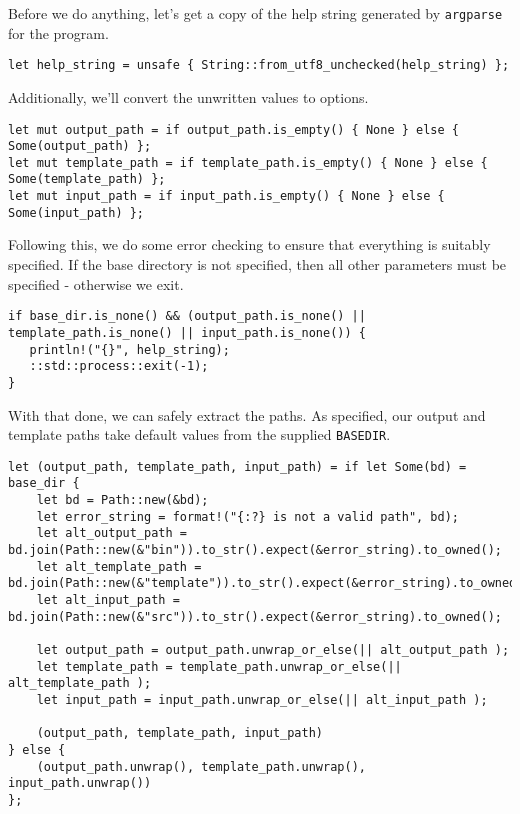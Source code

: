 \documentclass[11pt]{article}
\begin{document}
Before we do anything, let's get a copy of the help string generated by \texttt{argparse} for the program.
\begin{verbatim}
let help_string = unsafe { String::from_utf8_unchecked(help_string) };
\end{verbatim}

Additionally, we'll convert the unwritten values to options.
\begin{verbatim}
let mut output_path = if output_path.is_empty() { None } else { Some(output_path) };
let mut template_path = if template_path.is_empty() { None } else { Some(template_path) };
let mut input_path = if input_path.is_empty() { None } else { Some(input_path) };
\end{verbatim}

Following this, we  do some error checking to ensure that everything is suitably specified.
If the base directory is not specified, then all other parameters must be specified - otherwise we exit.
\begin{verbatim}
if base_dir.is_none() && (output_path.is_none() || template_path.is_none() || input_path.is_none()) {
   println!("{}", help_string);
   ::std::process::exit(-1);
}
\end{verbatim}

With that done, we can safely extract the paths.
As specified, our output and template paths take default values from the supplied \texttt{BASEDIR}.
\begin{verbatim}
let (output_path, template_path, input_path) = if let Some(bd) = base_dir {
    let bd = Path::new(&bd);
    let error_string = format!("{:?} is not a valid path", bd);
    let alt_output_path = bd.join(Path::new(&"bin")).to_str().expect(&error_string).to_owned();
    let alt_template_path = bd.join(Path::new(&"template")).to_str().expect(&error_string).to_owned();
    let alt_input_path = bd.join(Path::new(&"src")).to_str().expect(&error_string).to_owned();

    let output_path = output_path.unwrap_or_else(|| alt_output_path );
    let template_path = template_path.unwrap_or_else(|| alt_template_path );
    let input_path = input_path.unwrap_or_else(|| alt_input_path );

    (output_path, template_path, input_path)
} else {
    (output_path.unwrap(), template_path.unwrap(), input_path.unwrap())
};
\end{verbatim}
\end{document}
